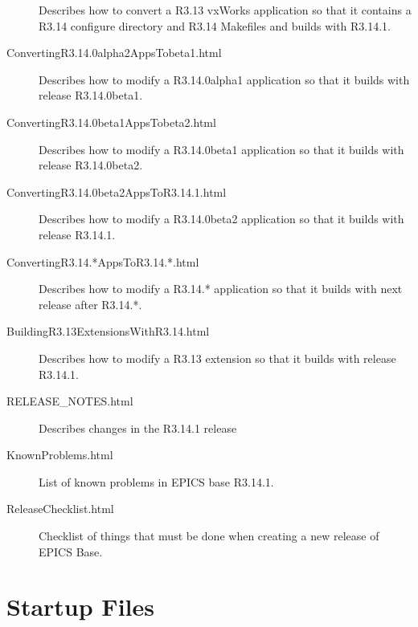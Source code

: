 \begin{description}
Describes how to convert a R3.13 vxWorks application so that it contains a R3.14 configure directory and R3.14 
Makefiles and builds with R3.14.1.

\item[ConvertingR3.14.0alpha2AppsTobeta1.html]

Describes how to modify a R3.14.0alpha1 application so that it builds with release R3.14.0beta1.

\item[ConvertingR3.14.0beta1AppsTobeta2.html]

Describes how to modify a R3.14.0beta1 application so that it builds with release R3.14.0beta2.

\item[ConvertingR3.14.0beta2AppsToR3.14.1.html]

Describes how to modify a R3.14.0beta2 application so that it builds with release R3.14.1.

\item[ConvertingR3.14.*AppsToR3.14.*.html]

Describes how to modify a R3.14.* application so that it builds with next release after R3.14.*.

\item[BuildingR3.13ExtensionsWithR3.14.html]

Describes how to modify a R3.13 extension so that it builds with release R3.14.1.

\item[RELEASE\_NOTES.html]

Describes changes in the R3.14.1 release

\item[KnownProblems.html]

List of known problems in EPICS base R3.14.1.

\item[ReleaseChecklist.html]

Checklist of things that must be done when creating a new release of EPICS Base.

\end{description}

\section{Startup Files}



